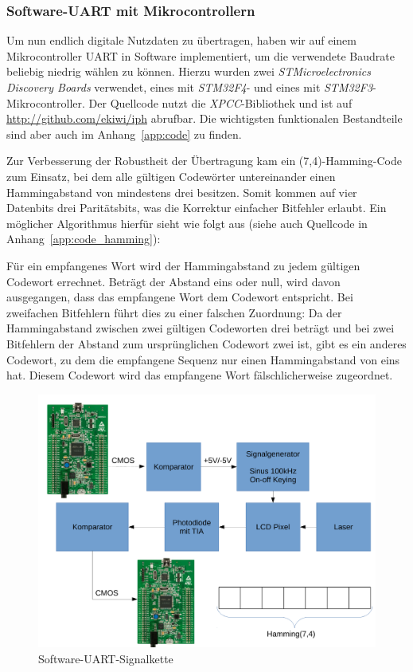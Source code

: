 \documentclass[12pt,a4paper]{article}
\begin{document}
\subsubsection{Software-UART mit Mikrocontrollern}
Um nun endlich digitale Nutzdaten zu übertragen, haben wir auf einem Mikrocontroller UART in Software implementiert, um die verwendete Baudrate beliebig niedrig wählen zu können. Hierzu wurden zwei \textit{STMicroelectronics Discovery Boards} verwendet, eines mit \textit{STM32F4}- und eines mit \textit{STM32F3}-Mikrocontroller. Der Quellcode nutzt die \textit{XPCC}-Bibliothek und ist auf \url{http://github.com/ekiwi/iph} abrufbar. Die wichtigsten funktionalen Bestandteile sind aber auch im Anhang~\ref{app:code} zu finden.

Zur Verbesserung der Robustheit der Übertragung kam ein (7,4)-Hamming-Code zum Einsatz, bei dem alle gültigen Codewörter untereinander einen Hammingabstand von mindestens drei besitzen. Somit kommen auf vier Datenbits drei Paritätsbits, was die Korrektur einfacher Bitfehler erlaubt. Ein möglicher Algorithmus hierfür sieht wie folgt aus (siehe auch Quellcode in Anhang~\ref{app:code_hamming}):

Für ein empfangenes Wort wird der Hammingabstand zu jedem gültigen Codewort errechnet. Beträgt der Abstand eins oder null, wird davon ausgegangen, dass das empfangene Wort dem Codewort entspricht. Bei zweifachen Bitfehlern führt dies zu einer falschen Zuordnung: Da der Hammingabstand zwischen zwei gültigen Codeworten drei beträgt und bei zwei Bitfehlern der Abstand zum ursprünglichen Codewort zwei ist, gibt es ein anderes Codewort, zu dem die empfangene Sequenz nur einen Hammingabstand von eins hat. Diesem Codewort wird das empfangene Wort fälschlicherweise zugeordnet.

\begin{figure}[H]
  \centering
  \includegraphics[width=\textwidth]{img/software_uart.pdf}
  \caption{Software-UART-Signalkette}
  \label{fig:sotware_uart_signal_chain}
\end{figure}
\end{document}
